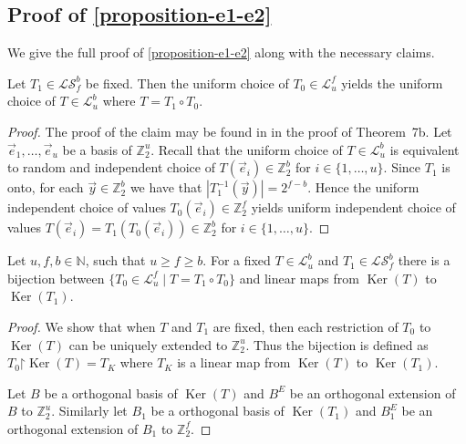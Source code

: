 \documentclass[unicode,review]{siamart1116}
\newcommand{\vecspace}[2]{\mathbb{Z}_{#1}^{#2}}
\newcommand{\binvecspace}[1]{\vecspace{2}{#1}}
\newcommand{\linearmaps}[2]{\mathcal{L}_{#1}^{#2}}
\newcommand{\surjectivelinearmaps}[2]{\mathcal{LS}_{#1}^{#2}}
\numberwithin{theorem}{section}
\begin{document}
\begin{appendix}
\section{Proof of \cref{proposition-e1-e2}}
We give the full proof of \cref{proposition-e1-e2} along with the necessary claims. 
\begin{proposition}
\label{claim-dstr-factor}
Let $T_1 \in \surjectivelinearmaps{f}{b}$ be fixed. Then the uniform choice of $T_0 \in \linearmaps{u}{f}$ yields the uniform choice of $T \in \linearmaps{u}{b}$ where $T = T_1 \circ T_0 $.
\end{proposition}
\begin{proof}
The proof of the claim may be found in \cite{alonetal} in the proof of Theorem~7b.
Let $\vec{e}_1, \dots, \vec{e}_u$ be a basis of $\binvecspace{u}$.
Recall that the uniform choice of $T \in \linearmaps{u}{b}$ is equivalent to random and independent choice of $T(\vec{e}_i) \in \binvecspace{b}$ for $i \in \{1, \dots, u\}$.
Since $T_1$ is onto, for each $\vec{y} \in \binvecspace{b}$ we have that $|T_1^{-1}(\vec{y})| = 2^{f - b}$.
Hence the uniform independent choice of values $T_0(\vec{e}_i) \in \binvecspace{f}$ yields uniform independent choice of values $T(\vec{e}_i) = T_1(T_0(\vec{e}_i)) \in \binvecspace{b}$ for $i \in \{1, \dots, u\}$.
\end{proof}

\begin{proposition}
\label{proposition-affine-model}
Let $u, f, b \in \mathbb{N}$, such that $u \geq f \geq b$.
For a fixed $T \in \linearmaps{u}{b}$ and $T_1 \in \surjectivelinearmaps{f}{b}$ there is a bijection between $\{ T_0 \in \linearmaps{u}{f} \mid T = T_1 \circ T_0 \}$ and linear maps from $\operatorname{Ker}(T)$ to $\operatorname{Ker}(T_1)$.
\end{proposition}
\begin{proof}
We show that when $T$ and $T_1$ are fixed, then each restriction of $T_0$ to $\operatorname{Ker}(T)$ can be uniquely extended to $\binvecspace{u}$.
Thus the bijection is defined as $T_0\mathord{\upharpoonright}\operatorname{Ker}(T) = T_K$ where $T_K$ is a linear map from $\operatorname{Ker}(T)$ to $\operatorname{Ker}(T_1)$.

Let $B$ be a orthogonal basis of $\operatorname{Ker}(T)$ and $B^E$ be an orthogonal extension of $B$ to $\binvecspace{u}$.
Similarly let $B_1$ be a orthogonal basis of $\operatorname{Ker}(T_1)$ and $B_1^E$ be an orthogonal extension of $B_1$ to $\binvecspace{f}$.


\end{proof}
\end{appendix}
\end{document}
